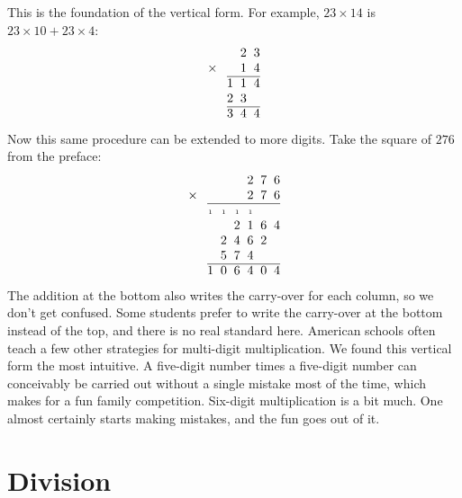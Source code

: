 This is the foundation of the vertical form. For example, $23 \times 14$ is $23 \times 10 + 23 \times 4$:
\[
  \begin{array}{@{}c@{\hspace{0.75em}}c@{\hspace{0.55em}}c@{\hspace{0.55em}}c@{}}
          &   & 2 & 3 \\
    \times &   & 1 & 4 \\
    \cline{2-4}
          & 1 & 1 & 4 \\
          & 2 & 3 &   \\
    \cline{2-4}
          & 3 & 4 & 4
  \end{array}
\]
Now this same procedure can be extended to more digits. Take the square of $276$ from the preface:
\[
  \begin{array}{@{}c@{\hspace{0.75em}}c@{\hspace{0.55em}}c@{\hspace{0.55em}}c@{\hspace{0.55em}}c@{\hspace{0.55em}}c@{\hspace{0.55em}}c@{}}
          &   &   &   & 2 & 7 & 6 \\
    \times &   &   &   & 2 & 7 & 6 \\
    \cline{2-7}
          & {\scriptscriptstyle 1} & {\scriptscriptstyle 1} & {\scriptscriptstyle 1} & {\scriptscriptstyle 1} & & \\
          &   &   & 2 & 1 & 6 & 4 \\
          &   & 2 & 4 & 6 & 2 &   \\
          &   & 5 & 7 & 4 &   &   \\
    \cline{2-7}
          & 1 & 0 & 6 & 4 & 0 & 4
  \end{array}
\]
The addition at the bottom also writes the carry-over for each column, so we don't get confused. Some students prefer to write the carry-over at the bottom instead of the top, and there is no real standard here. American schools often teach a few other strategies for multi-digit multiplication. We found this vertical form the most intuitive. A five-digit number times a five-digit number can conceivably be carried out without a single mistake most of the time, which makes for a fun family competition. Six-digit multiplication is a bit much. One almost certainly starts making mistakes, and the fun goes out of it.

\section{Division}

